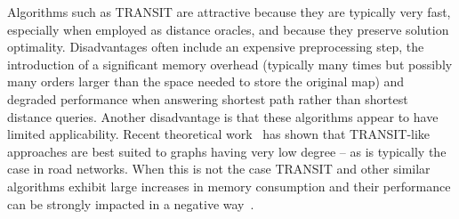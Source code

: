 Algorithms such as TRANSIT are attractive because they are typically very
fast, especially when employed as distance oracles, and because they preserve
solution optimality. Disadvantages often include an expensive preprocessing
step, the introduction of a significant memory overhead (typically many times
but possibly many orders larger than the space needed to store the original
map) and degraded performance when answering shortest path rather than
shortest distance queries.  Another disadvantage is that these algorithms
appear to have limited applicability. Recent theoretical
work~\citep{abraham10} has shown that TRANSIT-like approaches are best suited
to graphs having very low degree -- as is typically the case in road networks.
When this is not the case TRANSIT and other similar algorithms exhibit large
increases in memory consumption and their performance can be strongly impacted
in a negative way~\citep{antsfeld12}.
